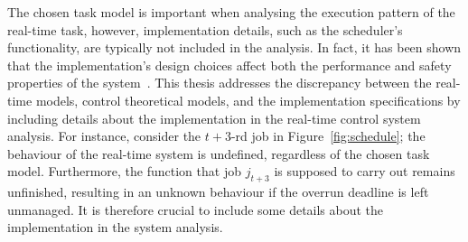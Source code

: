 The chosen task model is important when analysing the execution pattern of the real-time task, however, implementation details, such as the scheduler's functionality, are typically not included in the analysis.
In fact, it has been shown that the implementation's design choices affect both the performance and safety properties of the system~\cite{Cervin:2005}.
This thesis addresses the discrepancy between the real-time models, control theoretical models, and the implementation specifications by including details about the implementation in the real-time control system analysis.
For instance, consider the $t+3$-rd job in Figure~\ref{fig:schedule}; the behaviour of the real-time system is undefined, regardless of the chosen task model.
Furthermore, the function that job $j_{t+3}$ is supposed to carry out remains unfinished, resulting in an unknown behaviour if the overrun deadline is left unmanaged.
It is therefore crucial to include some details about the implementation in the system analysis.

